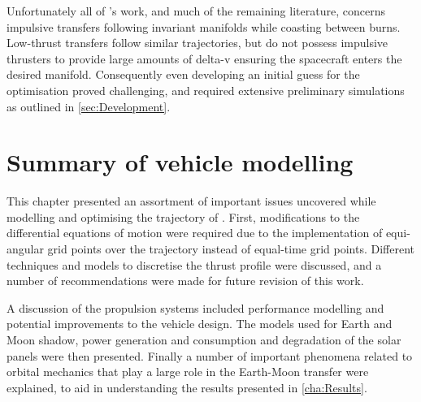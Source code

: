 Unfortunately all of \citeauthor{Belbruno2004}'s work, and much of the remaining literature, concerns impulsive transfers following invariant manifolds while coasting between burns. Low-thrust transfers follow similar trajectories, but do not possess impulsive thrusters to provide large amounts of delta-v ensuring the spacecraft enters the desired manifold. Consequently even developing an initial guess for the optimisation proved challenging, and required extensive preliminary simulations as outlined in \autoref{sec:Development}.

 

\section{Summary of vehicle modelling} \label{sec:Summary-vehicle}

This chapter presented an assortment of important issues uncovered while modelling and optimising the trajectory of \BW. First, modifications to the differential equations of motion were required due to the implementation of equi-angular grid points over the trajectory instead of equal-time grid points. Different techniques and models to discretise the thrust profile were discussed, and a number of recommendations were made for future revision of this work. 

A discussion of the propulsion systems included performance modelling and potential improvements to the vehicle design. The models used for Earth and Moon shadow, power generation and consumption and degradation of the solar panels were then presented. Finally a number of important phenomena related to orbital mechanics that play a large role in the Earth-Moon transfer were explained, to aid in understanding the results presented in \autoref{cha:Results}.